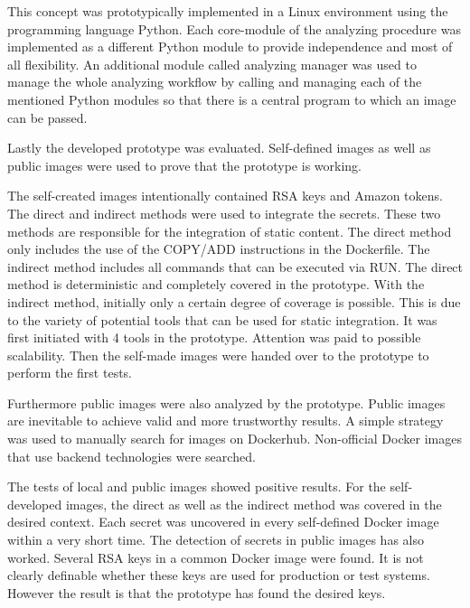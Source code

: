 This concept was prototypically implemented in a Linux environment using the programming language Python.
Each core-module of the analyzing procedure was implemented as a different Python module to provide independence and most of all flexibility. 
An additional module called analyzing manager was used to manage the whole analyzing workflow by calling and managing each of the mentioned Python modules so that there is a central program to which an image can be passed.

Lastly the developed prototype was evaluated. 
Self-defined images as well as public images were used to prove that the prototype is working.

The self-created images intentionally contained RSA keys and Amazon tokens.
The direct and indirect methods were used to integrate the secrets.
These two methods are responsible for the integration of static content.
The direct method only includes the use of the COPY/ADD instructions in the Dockerfile.
The indirect method includes all commands that can be executed via RUN.
The direct method is deterministic and completely covered in the prototype.
With the indirect method, initially only a certain degree of coverage is possible.
This is due to the variety of potential tools that can be used for static integration.
It was first initiated with 4 tools in the prototype. Attention was paid to possible scalability.
Then the self-made images were handed over to the prototype to perform the first tests.

Furthermore public images were also analyzed by the prototype.
Public images are inevitable to achieve valid and more trustworthy results.
A simple strategy was used to manually search for images on Dockerhub.
Non-official Docker images that use backend technologies were searched.

The tests of local and public images showed positive results.
For the self-developed images, the direct as well as the indirect method was covered in the desired context.
Each secret was uncovered in every self-defined Docker image within a very short time.
The detection of secrets in public images has also worked.
Several RSA keys in a common Docker image were found.
It is not clearly definable whether these keys are used for production or test systems.
However the result is that the prototype has found the desired keys.





